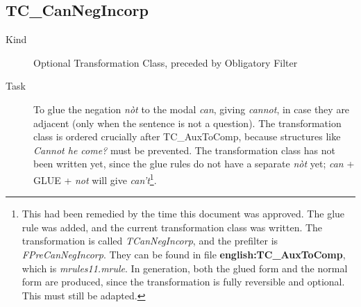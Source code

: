 \newpage
\subsection{TC\_CanNegIncorp}
\begin{description}
\item[Kind] Optional Transformation Class, preceded by Obligatory Filter
\item[Task] To glue the negation {\em n\`{o}t\/} to the modal {\em can\/}, 
giving {\em cannot\/},
in case they are adjacent (only when the sentence is not a question). The 
transformation class is ordered crucially after TC\_AuxToComp, because 
structures like {\em Cannot he come?\/} must be prevented. The transformation 
class has not been written yet, since the glue rules do not have a separate 
{\em n\`{o}t\/} yet; {\em can\/} + GLUE + {\em not\/} will give {\em 
can't\/}\footnote{This had been remedied by the time this document was 
approved. The glue rule was added, and the current transformation class was 
written. The transformation is called {\em TCanNegIncorp\/}, and the prefilter 
is 
{\em FPreCanNegIncorp\/}. They can be found in file {\bf 
english:TC\_AuxToComp}, which is {\em mrules11.mrule\/}. In generation, both 
the glued form and the normal form are produced, since the transformation is 
fully reversible and optional. This must still be adapted.}.

\end{description}

\newpage
